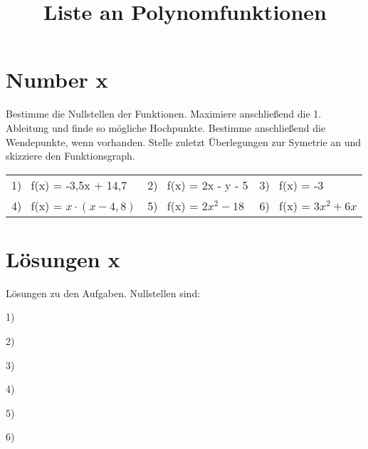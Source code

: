 \documentclass[10pt,a4paper]{article}
\begin{document}
\title{Liste an Polynomfunktionen}

\makeatletter
\def\@maketitle{%
  \newpage
  \null
  \vskip 2em%
  \begin{center}%
  \let \footnote \thanks
    {\Huge\bfseries\@title \par}%
    \vskip 1.5em%
    {\large
      \lineskip .5em%
      \begin{tabular}[t]{c}%
        \@author
      \end{tabular}\par}%
    \vskip 1em%
    {\large \@date}%
  \end{center}%
  \par
  \vskip 1.5em}
\makeatother

\author{}
\date{}

\maketitle

\section*{Number x}

Bestimme die Nullstellen der Funktionen. \newline
Maximiere anschließend die 1. Ableitung und finde so mögliche Hochpunkte. \newline
Bestimme anschließend die Wendepunkte, wenn vorhanden. \newline
Stelle zuletzt Überlegungen zur Symetrie an und skizziere den Funktionsgraph. \newline

\begin{tabular}{l l l}

    1) \ f(x) = -3,5x + 14,7 & 2) \ f(x) = 2x - y - 5 & 3) \ f(x) = -3 \\
    4) \ f(x) = $x \cdot (x - 4,8)$ & 5) \ f(x) = $2x^2 - 18$ & 6) \ f(x) = $3x^2 + 6x$

\end{tabular}

\section*{Lösungen x}

Lösungen zu den Aufgaben. Nullstellen sind: \newline

1)

2)

3)

4)

5)

6)
\end{document}
